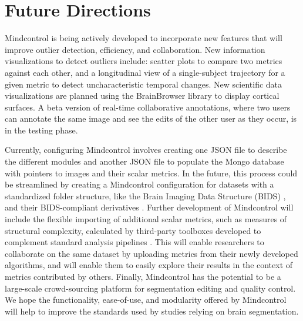 \section{Future Directions}

Mindcontrol is being actively developed to incorporate new features that will improve outlier detection, efficiency, and collaboration. New information visualizations to detect outliers include: scatter plots to compare two metrics against each other, and a longitudinal view of a single-subject trajectory for a given metric to detect uncharacteristic temporal changes. New scientific data visualizations are planned using the BrainBrowser library \cite{Sherif_2015} to display cortical surfaces. A beta version of real-time collaborative annotations, where two users can annotate the same image and see the edits of the other user as they occur, is in the testing phase. 

Currently, configuring Mindcontrol involves creating one JSON file to describe the different modules and another JSON file to populate the Mongo database with pointers to images and their scalar metrics. In the future, this process could be streamlined by creating a Mindcontrol configuration for datasets with a standardized folder structure, like the Brain Imaging Data Structure (BIDS) \cite{Gorgolewski_2016}, and their BIDS-compliant derivatives \cite{gorgolewski2016bids}. Further development of Mindcontrol will include the flexible importing of additional scalar metrics, such as measures of structural complexity, calculated by third-party toolboxes developed to complement standard analysis pipelines \cite{madan2016,madan2017}. This will enable researchers to collaborate on the same dataset by uploading metrics from their newly developed algorithms, and will enable them to easily explore their results in the context of metrics contributed by others. Finally, Mindcontrol has the potential to be a large-scale crowd-sourcing platform for segmentation editing and quality control. We hope the functionality, ease-of-use, and modularity offered by Mindcontrol will help to improve the standards used by studies relying on brain segmentation. 